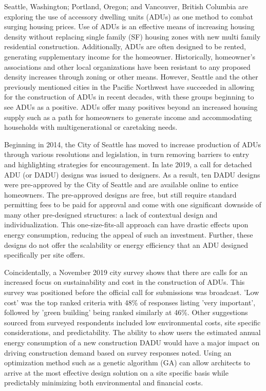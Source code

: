 \documentclass[sagev,times,Review,doublespace]{sagej}
\begin{document}
Seattle, Washington; Portland, Oregon; and Vancouver, British Columbia are exploring the use of accessory dwelling units (ADUs) as one method to combat surging housing prices. Use of ADUs is an effective means of increasing housing density without replacing single family (SF) housing zones with new multi family residential construction. Additionally, ADUs are often designed to be rented, generating supplementary income for the homeowner. Historically, homeowner’s associations and other local organizations have  been resistant to any proposed density increases through zoning or other means\cite{10.2307/24392672}. However, Seattle and the other previously mentioned cities in the Pacific Northwest have succeeded in allowing for the construction of ADUs in recent decades, with these groups beginning to see ADUs as a positive. ADUs offer many positives beyond an increased housing supply such as a path for homeowners to generate income and accommodating households with multigenerational or caretaking needs.

Beginning in 2014, the City of Seattle has moved to increase production of ADUs through various resolutions and legislation, in turn removing barriers to entry and highlighting strategies for encouragement. In late 2019, a call for detached ADU (or DADU) designs was issued to designers. As a result, ten DADU designs were pre-approved by the City of Seattle and are available online to entice homeowners\cite{ADUniversePreapprovedADU}. The pre-approved designs are free, but still require standard permitting fees to be paid for approval and come with one significant downside of many other pre-designed structures: a lack of contextual design and individualization. This one-size-fits-all approach can have drastic effects upon energy consumption, reducing the appeal of such an investment. Further, these designs do not offer the scalability or energy efficiency that an ADU designed specifically per site offers.

 Coincidentally, a November 2019 city survey shows that there are calls for an increased focus on sustainability and cost in the construction of ADUs\cite{seattlePreapprovedPlansAccessory2019}. This survey was positioned before the official call for submissions was broadcast. 'Low cost' was the top ranked criteria with 48\% of responses listing 'very important', followed by 'green building' being ranked similarly at 46\%. Other suggestions sourced from surveyed respondents included low environmental costs, site specific considerations, and predictability. The ability to show users the estimated annual energy consumption of a new construction DADU would have a major impact on driving construction demand based on survey responses noted. Using an optimization method such as a genetic algorithm (GA) can allow architects to arrive at the most effective design solution on a site specific basis while predictably minimizing both environmental and financial costs. 
 
\end{document}
